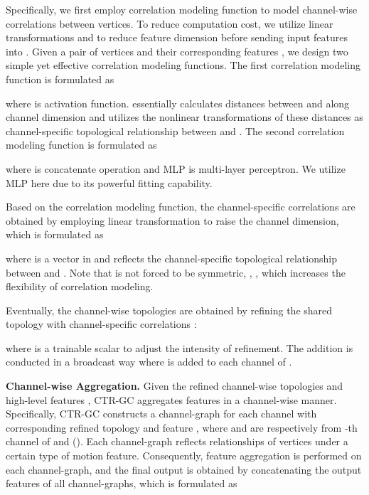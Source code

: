 \documentclass[10pt,twocolumn,letterpaper]{article}
\begin{document}
Specifically, we first employ correlation modeling function  to model channel-wise correlations between vertices. To reduce computation cost, we utilize linear transformations  and  to reduce feature dimension before sending input features into . Given a pair of vertices  and their corresponding features , we design two simple yet effective correlation modeling functions. The first correlation modeling function  is formulated as
\vspace{-0.16cm}

where  is activation function.  essentially calculates distances between  and  along channel dimension and utilizes the nonlinear transformations of these distances as channel-specific topological relationship between  and . The second correlation modeling function  is formulated as
\vspace{-0.16cm}

where  is concatenate operation and MLP is multi-layer perceptron. We utilize MLP here due to its powerful fitting capability.

Based on the correlation modeling function, the channel-specific correlations  are obtained by employing linear transformation  to raise the channel dimension, which is formulated as
\vspace{-0.16cm}

where  is a vector in  and reflects the channel-specific topological relationship between  and . Note that  is not forced to be symmetric, \ie, , which increases the flexibility of correlation modeling.

Eventually, the channel-wise topologies  are obtained by refining the shared topology  with channel-specific correlations :
\vspace{-0.16cm}

where  is a trainable scalar to adjust the intensity of refinement. The addition is conducted in a broadcast way where  is added to each channel of .

\noindent \textbf{Channel-wise Aggregation.} Given the refined channel-wise topologies  and high-level features , CTR-GC aggregates features in a channel-wise manner. Specifically, CTR-GC constructs a channel-graph for each channel with corresponding refined topology  and feature , where  and  are respectively from -th channel of  and  (). Each channel-graph reflects relationships of vertices under a certain type of motion feature. Consequently, feature aggregation is performed on each channel-graph, and the final output  is obtained by concatenating the output features of all channel-graphs, which is formulated as
\vspace{-0.15cm}
\end{document}
